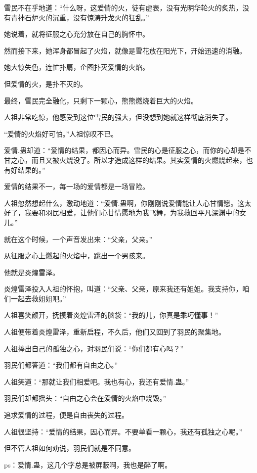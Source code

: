 \begin{this_body}
雪民不在乎地道：“什么呀，这爱情的火，徒有虚表，没有光明华轮火的炙热，没有青神石炉火的沉重，没有惊涛升龙火的狂乱。”

她说着，就将征服之心充分放在自己的胸怀中。

然而接下来，她浑身都冒起了火焰，就像是雪花放在阳光下，开始迅速的消融。

她大惊失色，连忙扑扇，企图扑灭爱情的火焰。

但爱情的火，是扑不灭的。

最终，雪民完全融化，只剩下一颗心，熊熊燃烧着巨大的火焰。

人祖非常吃惊，他感受到这位雪民的强大，但没想到她就这样彻底消失了。

“爱情的火焰好可怕。”人祖惊叹不已。

爱情.蛊却道：“爱情的结果，都因心而异。雪民的心是征服之心，而你的心却是不甘之心，而且又被火烧没了。所以才造成这样的结果。其实爱情的火燃烧起来，也有好结果的。”

爱情的结果不一，每一场的爱情都是一场冒险。

人祖忽然想起什么，激动地道：“爱情.蛊啊，你刚刚说爱情能让人心甘情愿。这太好了，我要和羽民相爱，让他们心甘情愿地为我飞舞，为我救回平凡深渊中的女儿。”

就在这个时候，一个声音发出来：“父亲，父亲。”

从征服之心上燃起的火焰中，跳出一个男孩来。

他就是炎煌雷泽。

炎煌雷泽投入人祖的怀抱，叫道：“父亲、父亲，原来我还有姐姐。我支持你，咱们一起去救姐姐吧。”

人祖喜笑颜开，抚摸着炎煌雷泽的脑袋：“我的儿，你真是乖巧懂事！”

人祖便带着炎煌雷泽，重新启程，不久后，他们又回到了羽民的聚集地。

人祖捧出自己的孤独之心，对羽民们说：“你们都有心吗？”

羽民们都答道：“我们都有自由之心。”

人祖笑道：“那就让我们相爱吧。我也有心，我还有爱情.蛊。”

羽民们却都摇头：“自由之心会在爱情的火焰中烧毁。”

追求爱情的过程，便是自由丧失的过程。

人祖很坚持：“爱情的结果，因心而异。不要单看一颗心，我还有孤独之心呢。”

但不管人祖如何劝说，羽民们就是不同意。

ps：爱情.蛊，这几个字总是被屏蔽啊，我也是醉了啊。

\end{this_body}

